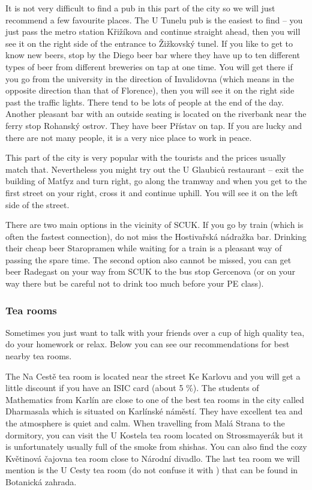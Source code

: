 It is not very difficult to find a pub in this part of the city so we will just
recommend a few favourite places.
The U Tunelu pub is the easiest to find -- you just pass the metro station
Křižíkova and continue straight ahead, then you will see it on the right side of
the entrance to Žižkovský tunel.
If you like to get to know new beers, stop by the Diego beer bar where they have
up to ten different types of beer from different breweries on tap at one time.
You will get there if you go from the university in the direction of Invalidovna
(which means in the opposite direction than that of Florence), then you will see
it on the right side past the traffic lights. There tend to be lots of people at
the end of the day.
Another pleasant bar with an outside seating is located on the riverbank near
the ferry stop Rohanský ostrov. They have beer Přístav on tap. If you are lucky
and there are not many people, it is a very nice place to work in peace.

This part of the city is very popular with the tourists and the prices usually
match that.
Nevertheless you might try out the U Glaubiců restaurant -- exit the building of
Matfyz and turn right, go along the tramway and when you get to the first street
on your right, cross it and continue uphill. You will see it on the left side of
the street.

There are two main options in the vicinity of SCUK.
If you go by train (which is often the fastest connection), do not miss the
Hostivařská nádražka bar. Drinking their cheap beer Staropramen while waiting
for a train is a pleasant way of passing the spare time.
The second option also cannot be missed, you can get beer Radegast on your way
from SCUK to the bus stop Gercenova (or on your way there but be careful not to
drink too much before your PE class).


\subsubsection{Tea rooms}
Sometimes you just want to talk with your friends over a cup of high quality
tea, do your homework or relax. Below you can see our recommendations for best
nearby tea rooms.

The Na Cestě tea room is located near the street Ke Karlovu and you will get a
little discount if you have an ISIC card (about 5 \%).
The students of Mathematics from Karlín are close to one of the best tea rooms
in the city called Dharmasala which is situated on Karlínské náměstí. They have
excellent tea and the atmosphere is quiet and calm.
When travelling from Malá Strana to the dormitory, you can visit the U Kostela
tea room located on Strossmayerák but it is unfortunately usually full of the
smoke from shishas.
You can also find the cozy Květinová čajovna tea room close to Národní divadlo.
The last tea room we will mention is the U Cesty tea room (do not confuse it
with ) that can be found in Botanická zahrada.

